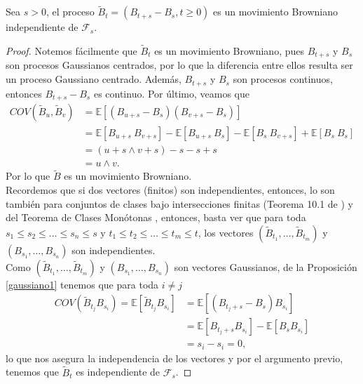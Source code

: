 \begin{theorem}
Sea $s > 0$, el proceso $\tilde{B}_t = (B_{t+s} - B_s, t \geq 0)$ es un movimiento Browniano independiente de $\mathcal{F}_s$.
\end{theorem}
\begin{proof}
Notemos fácilmente que $\tilde{B}_t$ es un movimiento Browniano, pues $B_{t+s}$ y $B_s$ son procesos Gaussianos centrados, por lo que la diferencia entre ellos resulta ser un proceso Gaussiano centrado. Además, $B_{t+s}$ y $B_s$ son procesos continuos, entonces $B_{t+s} - B_s$ es continuo. Por último, veamos que
	\begin{align*}
	COV \left( \tilde{B}_u, \tilde{B}_v \right) & =  \mathbb{E} \left[ (B_{u+s} - B_s) (B_{v+s} - B_s) \right]  \\ 
	& = \mathbb{E} [B_{u+s} \ B_{v+s}] - \mathbb{E} [B_{u+s} \ B_s] - \mathbb{E}[B_s \ B_{v+s}] + \mathbb{E}[B_s \ B_s] \\
	& = (u + s \wedge v + s) - s - s + s  \\
	& = u  \wedge v. 
	\end{align*}
Por lo que $\tilde{B}$ es un movimiento Browniano. \\

Recordemos que si dos vectores (finitos) son independientes, entonces, lo son también para conjuntos de clases bajo intersecciones finitas (Teorema 10.1 de \cite[p.~65]{jacodprotter}) y del Teorema de Clases Monótonas \cite[p.~36]{jacodprotter}, entonces, basta ver que para toda $s_1 \leq s_2 \leq \ldots \leq s_n \leq s$ y $t_1 \leq t_2 \leq \ldots \leq t_m \leq t$, los vectores $(\tilde{B}_{t_1}, \ldots, \tilde{B}_{t_m})$ y $(B_{s_1}, \ldots, B_{s_n})$ son independientes. \\

Como $(\tilde{B}_{t_1}, \ldots, \tilde{B}_{t_m})$ y $(B_{s_1}, \ldots, B_{s_n})$ son vectores Gaussianos, de la Proposición \ref{gaussiano1} tenemos que para toda $i \neq j$
	\begin{align*}
	COV(\tilde{B}_{t_j} B_{s_i}) = \mathbb{E} \left[ \tilde{B}_{t_j} B_{s_i} \right] & = \mathbb{E} \left[ \left( B_{t_j + s} - B_s \right) B_{s_i} \right] \\
	& = \mathbb{E} \left[ B_{t_j + s}B_{s_i} \right] - \mathbb{E} \left[ B_s B_{s_i} \right] \\
	& = s_i - s_i = 0,
	\end{align*}
lo que nos asegura la independencia de los vectores y por el argumento previo, tenemos que $\tilde{B}_t$ es independiente de $\mathcal{F}_s$.
\end{proof}

